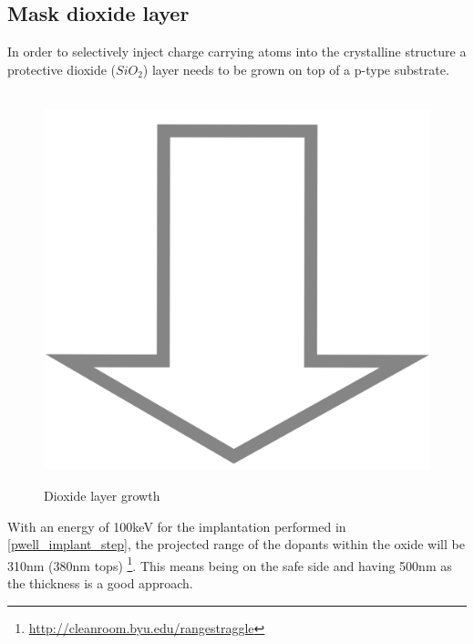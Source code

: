 \subsection{Mask dioxide layer}
In order to selectively inject charge carrying atoms into the crystalline structure a protective dioxide ($SiO_2$) layer needs to be grown on top of a p-type substrate.
\begin{figure}[H]
	\centering
	\begin{tikzpicture}[node distance = 3cm, auto, thick,scale=\CrossSectionOnly, every node/.style={transform shape}]
		
	\end{tikzpicture} \\
	\includegraphics[scale=0.01]{down_arrow.png} \\
	\begin{tikzpicture}[node distance = 3cm, auto, thick,scale=\CrossSectionOnly, every node/.style={transform shape}]
		
	\end{tikzpicture}
	\caption{Dioxide layer growth}
\end{figure}
With an energy of 100keV for the implantation performed in \autoref{pwell_implant_step}, the projected range of the dopants within the oxide will be 310nm (380nm tops) \footnote{\url{http://cleanroom.byu.edu/rangestraggle}}.
This means being on the safe side and having 500nm as the thickness is a good approach.

